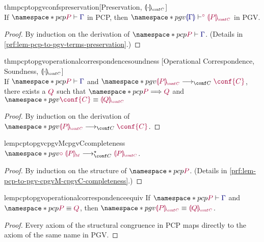 \documentclass[main.tex]{subfiles}
\begin{document}
\begin{restatabletheorem}{thmpcptopgvconfspreservation}[Preservation, $\cpgvC{\cdot}$]
  \label{thm:pcp-to-pgv-confs-preservation}
  \hfill\\%
  If $\pcp{\seq{P}{\ty{\Gamma}}}$ in PCP,
  then $\pgv{\cseq[\child]{\ty{\cpgvT{\Gamma}}}{\cpgvC{P}}}$ in PGV.
\end{restatabletheorem}
\begin{proof}
  By induction on the derivation of $\pcp{\seq{P}{\ty{\Gamma}}}$.
  (Details in \cref{prf:lem-pcp-to-pgv-terms-preservation}.)
\end{proof}

\begin{restatabletheorem}{thmpcptopgvoperationalcorrespondencesoundness}%
  [Operational Correspondence, Soundness, $\cpgvC{\cdot}$]
  \label{thm:pcp-to-pgv-operational-correspondence-soundness}
  \hfill\\%
  If $\pcp{\seq{P}{\ty{\Gamma}}}$ and $\pgv{\tm{\cpgvC{P}}\cred\tm{\conf{C}}}$,
  there exists a $\tm{Q}$ such that $\pcp{\tm{P}\red\tm{Q}}$ and $\pgv{\tm{\conf{C}}\equiv\tm{\cpgvC{Q}}}$
\end{restatabletheorem}
\begin{proof}
  By induction on the derivation of $\pgv{\tm{\cpgvC{P}}\cred\tm{\conf{C}}}$.
  \admit
\end{proof}

\begin{restatablelemma}{lempcptopgvcpgvMcpgvCcompleteness}
  \label{lem:pcp-to-pgv-cpgvM-cpgvC-completeness}
  $\pgv{\tm{\child\;\cpgvM{P}}\cred^\star\tm{\cpgvC{P}}}$.
\end{restatablelemma}
\begin{proof}
  By induction on the structure of $\pcp{\tm{P}}$.
  (Details in \cref{prf:lem-pcp-to-pgv-cpgvM-cpgvC-completeness}.)
\end{proof}

\begin{restatablelemma}{lempcptopgvoperationalcorrespondenceequiv}%
  \label{lem:pcp-to-pgv-confs-operational-correspondence-equiv}
  If $\pcp{\seq{P}{\ty{\Gamma}}}$ and $\pcp{\tm{P}\equiv\tm{Q}}$,
  then $\pgv{\tm{\cpgvC{P}}\equiv\tm{\cpgvC{Q}}}$.
\end{restatablelemma}
\begin{proof}
  \label{prf:lem-pcp-to-pgv-confs-operational-correspondence-equiv}
  Every axiom of the structural congruence in PCP maps directly to the axiom of the same name in PGV.
\end{proof}
\end{document}
